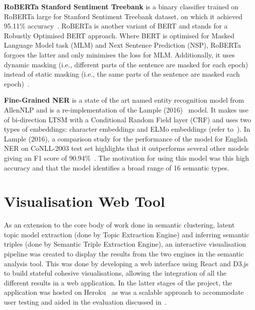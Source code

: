 \textbf{RoBERTa Stanford Sentiment Treebank} is a binary classifier trained on RoBERTa large for Stanford Sentiment Treebank dataset, on which it achieved 95.11\% accuracy~\cite{roberta}. RoBERTa is another variant of BERT and stands for a Robustly Optimised BERT approach. Where BERT is optimised for Masked Language Model task (MLM) and Next Sentence Prediction (NSP), RoBERTa forgoes the latter and only minimises the loss for MLM. Additionally, it uses dynamic masking (i.e., different parts of the sentence are masked for each epoch) instead of static masking (i.e., the same parts of the sentence are masked each epoch)~\cite{roberta}. 

\textbf{Fine-Grained NER} is a state of the art named entity recognition model from AllenNLP and is a re-implementation of the Lample (2016)~\cite{lample} model. It makes use of bi-direction LTSM with a Conditional Random Field layer (CRF) and uses two types of embeddings: character embeddings and ELMo embeddings (refer to~). In Lample (2016), a comparison study for the performance of the model for English NER on CoNLL-2003 test set highlights that it outperforms several other models giving an F1 score of 90.94\%~\cite{lample}. The motivation for using this model was this high accuracy and that the model identifies a broad range of 16 semantic types.

\section{Visualisation Web Tool}
As an extension to the core body of work done in semantic clustering, latent topic model extraction (done by Topic Extraction Engine) and inferring semantic triples (done by Semantic Triple Extraction Engine), an interactive visualisation pipeline was created to display the results from the two engines in the semantic analysis tool. 
This was done by developing a web interface using React and D3.js to build stateful cohesive visualisations, allowing the integration of all the different results in a web application. In the latter stages of the project, the application was hosted on Heroku~\cite{heroku} as was a scalable approach to accommodate user testing and aided in the evaluation discussed in~.